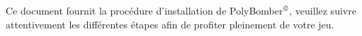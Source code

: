 	Ce document fournit la procédure d'installation de PolyBomber$^{\mbox{\scriptsize{\copyright}}}$, veuillez suivre attentivement les différentes étapes afin de profiter pleinement de votre jeu.